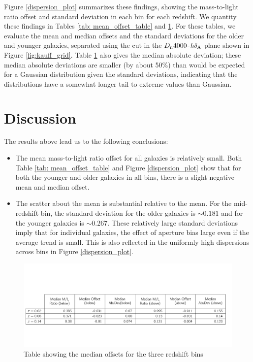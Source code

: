 Figure \ref{dispersion_plot} summarizes these findings, showing
the mass-to-light ratio offset and standard deviation in each bin 
for each redshift.
We quantity these findings in Tables \ref{tab: mean_offset_table} 
and  \ref{tab: median_offsets}. For these tables, we evaluate the
mean and median offsets and the standard deviations for the older 
and younger galaxies, separated using the cut in the 
$D_{\rm n}4000$-$h\delta_{\rm A}$ plane shown in 
Figure \ref{fig:kauff_grid}.  Table \ref{tab: median_offsets} also 
gives the median absolute deviation; these median absolute deviations
are smaller (by about 50\%) than would be expected for a Gaussian 
distribution given the standard deviations, indicating that the 
distributions have a somewhat longer tail to extreme values than
Gaussian.
 

\section{Discussion}
\label{ch2_discussion}
The results above lead us to the following conclusions:

\begin{itemize}
\item{The mean mass-to-light ratio offset for all galaxies is relatively 
small. Both Table \ref{tab: mean_offset_table} and Figure 
\ref{dispersion_plot} show that for both the younger and older galaxies 
in all bins, there is a slight negative mean and median offset.}
\item{The scatter about the mean is substantial relative to the mean. 
For the mid-redshift bin, the standard deviation for the older galaxies 
is $\sim 0.181$ and for the younger galaxies is $\sim 0.267$. These 
relatively large standard deviations imply that for individual galaxies, 
the effect of aperture bias large even if the average trend is small. 
This is also reflected in the uniformly high dispersions across bins 
in Figure \ref{dispersion_plot}.}
\end{itemize}

\begin{figure}
\includegraphics[width=\textwidth]{figures/table_median.pdf}
\caption[Table showing the median offsets for the three redshift bins.]
{Table showing the median offsets for the three redshift bins
\label{tab: median_offsets}}
\end{figure}

